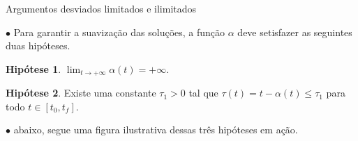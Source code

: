 \documentclass{beamer}
\theoremstyle{plain}
\theoremstyle{definition}
\newtheorem{hip}{Hipótese}
\begin{document}
%
%
%



\begin{frame}{Argumentos desviados limitados e ilimitados}
    
    $\bullet$ Para garantir a suavização das soluções, a função $\alpha$ deve setisfazer as seguintes duas hipóteses.

    \begin{hip}
        \label{H2:hipotese:hypothesis}
        $\lim _{t \rightarrow+\infty} \alpha(t)=+\infty$.
    \end{hip}


    \begin{hip}
        \label{H3:hipotese:hypothesis}
        Existe uma constante \(\tau_{1}>0\) tal que \(\tau(t)=t-\alpha(t) \leq \tau_{1}\) para todo \(t \in\left[t_{0}, t_{f}\right]\).
    \end{hip}

    $\bullet$ abaixo, segue uma figura ilustrativa dessas três hipóteses em ação.

\end{frame}



\end{document}
